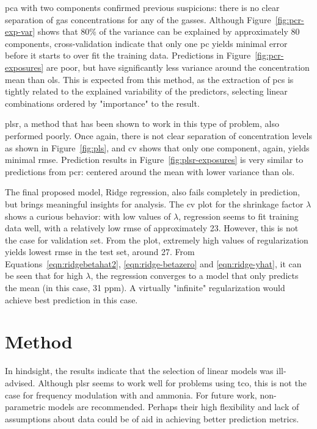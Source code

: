 \acrshort{pca} with two components confirmed previous suspicions: there is no clear separation of gas concentrations for any of the gasses. Although Figure~\ref{fig:pcr-exp-var} shows that 80\% of the variance can be explained by approximately 80 components, cross-validation indicate that only one \acrshort{pc} yields minimal error before it starts to over fit the training data. Predictions in Figure~\ref{fig:pcr-exposures} are poor, but have significantly less variance around the concentration mean than \acrshort{ols}. This is expected from this method, as the extraction of \acrshort{pc}s is tightly related to the explained variability of the predictors, selecting linear combinations ordered by "importance" to the result.

\acrshort{plsr}, a method that has been shown to work in this type of problem, also performed poorly. Once again, there is not clear separation of concentration levels as shown in Figure~\ref{fig:pls}, and \acrshort{cv} shows that only one component, again, yields minimal \acrshort{rmse}. Prediction results in Figure~\ref{fig:plsr-exposures} is very similar to predictions from \acrshort{pcr}: centered around the mean with lower variance than \acrshort{ols}.

The final proposed model, Ridge regression, also fails completely in prediction, but brings meaningful insights for analysis. The \acrshort{cv} plot for the shrinkage factor $\lambda$ shows a curious behavior: with low values of $\lambda$, regression seems to fit training data well, with a relatively low \acrshort{rmse} of approximately 23. However, this is not the case for validation set. From the plot, extremely high values of regularization yields lowest \acrshort{rmse} in the test set, around 27. From Equations~\ref{eqn:ridgebetahat2}, \ref{eqn:ridge-betazero} and \ref{eqn:ridge-yhat}, it can be seen that for high $\lambda$, the regression converges to a model that only predicts the mean (in this case, 31 ppm). A virtually "infinite" regularization would achieve best prediction in this case.

\section{Method}
\label{sec:discussion-method}

In hindsight, the results indicate that the selection of linear models was ill-advised. Although \acrshort{plsr} seems to work well for problems using \acrshort{tco}, this is not the case for frequency modulation with \nox and ammonia. For future work, non-parametric models are recommended. Perhaps their high flexibility and lack of assumptions about data could be of aid in achieving better prediction metrics.

